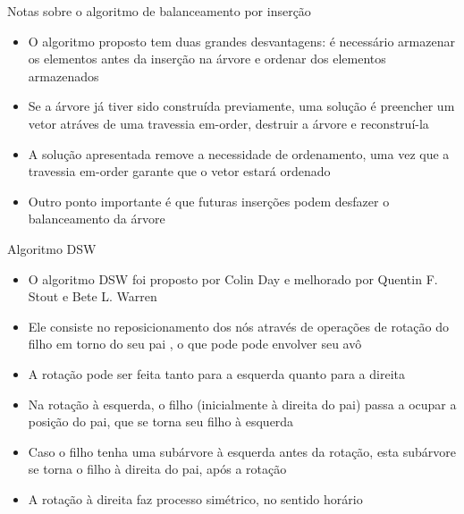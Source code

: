 \begin{frame}[fragile]{Notas sobre o algoritmo de balanceamento por inserção}

	\begin{itemize}
		\item O algoritmo proposto tem duas grandes {desvantagens}: é necessário {armazenar} os 
            elementos antes da inserção na árvore e ordenar dos elementos armazenados

		\item Se a árvore já tiver sido construída previamente, uma solução é {preencher} um vetor 
            atráves de uma travessia {em-order}, {destruir} a árvore e {reconstruí-la}

		\item A solução apresentada {remove} a necessidade de ordenamento, uma vez que a 
            travessia {em-order} garante que o vetor estará {ordenado}

        \item Outro ponto importante é que futuras inserções podem desfazer o balanceamento da árvore
	\end{itemize}

\end{frame}

\begin{frame}[fragile]{Algoritmo DSW}

	\begin{itemize}
		\item O algoritmo DSW foi proposto por {Colin Day} e melhorado por {Quentin F. Stout} e {Bete L. Warren}

		\item Ele consiste no {reposicionamento} dos nós através de operações de {rotação} do 
            filho  em torno do seu pai , o que pode pode envolver seu avô 

		\item A rotação pode ser feita tanto para a {esquerda} quanto para a {direita}

        \item Na rotação à esquerda, o filho (inicialmente à direita do pai) passa a ocupar a 
            posição do pai, que se torna seu filho à esquerda

        \item Caso o filho tenha uma subárvore à esquerda antes da rotação, esta subárvore se
            torna o filho à direita do pai, após a rotação

        \item A rotação à direita faz processo simétrico, no sentido horário
	\end{itemize}

\end{frame}

